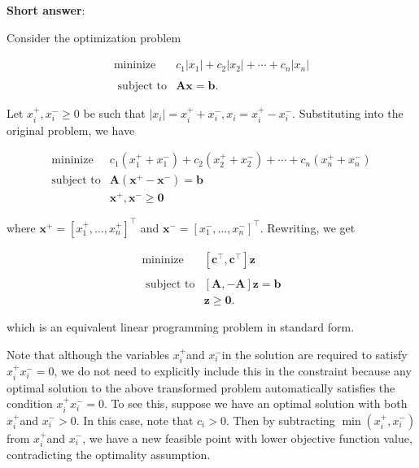 \textbf{Short answer}:

Consider the optimization problem

\[
	\begin{array}{rl}
		\operatorname{mininize} &  c_{1}\left|x_{1}\right|+c_{2}\left|x_{2}\right|+\cdots+c_{n}\left|x_{n}\right| \\
		& \\
		\text { subject to} & \boldsymbol{A} \boldsymbol{x}=\boldsymbol{b} .
	\end{array}
\]

Let \(x_{i}^{+}, x_{i}^{-} \geq 0\) be such that \(\left|x_{i}\right|=x_{i}^{+}+x_{i}^{-}, x_{i}=x_{i}^{+}-x_{i}^{-}\). Substituting into the original problem, we have

\[
	\begin{array}{rl}
		\operatorname{mininize} & c_{1}\left(x_{1}^{+}+x_{1}^{-}\right)+c_{2}\left(x_{2}^{+}+x_{2}^{-}\right)+\cdots+c_{n}\left(x_{n}^{+}+x_{n}^{-}\right) \\
		\text {subject to} & \boldsymbol{A} \left(\boldsymbol{x}^{+}-\boldsymbol{x}^{-}\right)=\boldsymbol{b} \\
		& \boldsymbol{x}^{+}, \boldsymbol{x}^{-} \geq \boldsymbol{0}
	\end{array}
\]

where \(\boldsymbol{x}^{+}=\left[x_{1}^{+}, \ldots, x_{n}^{+}\right]^{\top}\) and \(\boldsymbol{x}^{-}=\left[x_{1}^{-}, \ldots, x_{n}^{-}\right]^{\top}\). Rewriting, we get

\[
	\begin{array}{rl}
		\operatorname{mininize} & {\left[\boldsymbol{c}^{\top}, \boldsymbol{c}^{\top}\right] \boldsymbol{z} } \\
		& \\
		\text { subject to} & {[\boldsymbol{A},-\boldsymbol{A}] \boldsymbol{z}=\boldsymbol{b} } \\
		& \boldsymbol{z} \geq \boldsymbol{0}.
	\end{array}
\]

which is an equivalent linear programming problem in standard form.

Note that although the variables \(x_{i}^{+}\)and \(x_{i}^{-}\)in the solution are required to satisfy \(x_{i}^{+} x_{i}^{-}=0\), we do not need to explicitly include this in the constraint because any optimal solution to the above transformed problem automatically satisfies the condition \(x_{i}^{+} x_{i}^{-}=0\). To see this, suppose we have an optimal solution with both \(x_{i}^{+}\)and \(x_{i}^{-}>0\). In this case, note that \(c_{i}>0\). Then by subtracting \(\min \left(x_{i}^{+}, x_{i}^{-}\right)\)from \(x_{i}^{+}\)and \(x_{i}^{-}\), we have a new feasible point with lower objective function value, contradicting the optimality assumption.

